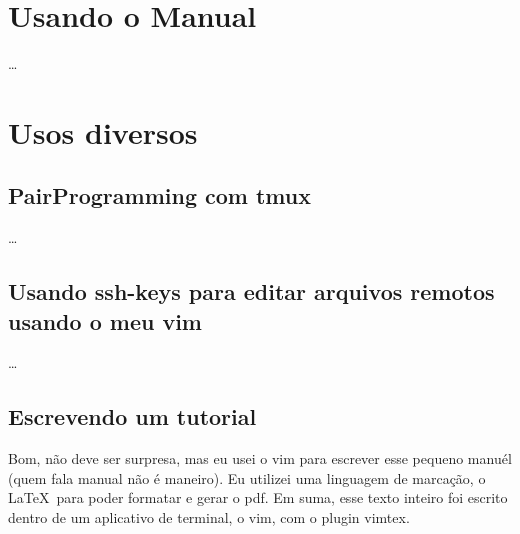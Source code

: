 \documentclass[a4paper,12pt,oneside]{book}
\begin{document}





\newcommand{\vimcommand}[1]{%
    \sethlcolor{lightgray}%
    \textbf{\textcolor{black}{\hl{#1}}}%
}
\newcommand{\vimkeys}[1]{%
    \sethlcolor{gray}%
	    \textbf{\textcolor{white}{\hl{#1}}}%
}
\newcommand{\insertfigure}[3]{
\begin{figure}[!htb]
\centering
\fbox{\texttt{[image: \#2]}}
\caption{#3}
\end{figure}
}













\chapter{Usando o Manual}
\ldots
\newpage

\chapter{Usos diversos}
\section{PairProgramming com tmux}
\ldots
\section{Usando ssh-keys para editar arquivos remotos usando o meu vim}
\ldots
\section{Escrevendo um tutorial}
Bom, não deve ser surpresa, mas eu usei o vim para escrever esse pequeno manuél (quem fala manual não é maneiro).
Eu utilizei uma linguagem de marcação, o \LaTeX\ para poder formatar e gerar o pdf.
Em suma, esse texto inteiro foi escrito dentro de um aplicativo de terminal, o vim, com o plugin vimtex.
\end{document}

